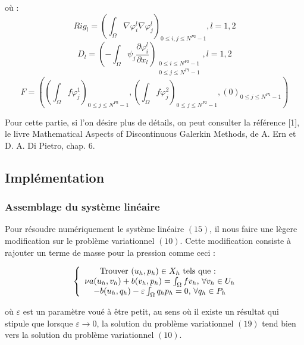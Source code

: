 \documentclass[a4paper,12pt]{article}
\begin{document}
où :
\begin{equation}
Rig_{l} = \left( \int_{\Omega} \nabla \varphi_{i}^{l} \nabla \varphi_{j}^{l} \right)_{0 \leq i,j \leq N^{P2}-1}, l = 1,2
\end{equation}
\begin{equation}
D_{l} = \left( -\int_{\Omega} \psi_{j} \frac{\partial \varphi_{i}^{l}}{\partial x_{l}} \right)_{\substack{
0 \leq i \leq N^{P2}-1 \\
0 \leq j \leq N^{P1}-1
}}, l=1,2
\end{equation}
\begin{equation}
F = \left( \left( \int_{\Omega} f\varphi_{j}^{1} \right)_{0 \leq j \leq N^{P2}-1}, \left( \int_{\Omega} f\varphi_{j}^{2} \right)_{0 \leq j \leq N^{P2}-1}, \left( 0 \right)_{0 \leq j \leq N^{P1}-1} \right)
\end{equation}

Pour cette partie, si l'on désire plus de détails, on peut consulter la référence [1], le livre Mathematical Aspects of Discontinuous Galerkin Methods, de A. Ern et D. A. Di Pietro, chap. 6.


\subsection{Implémentation}

\subsubsection{Assemblage du système linéaire}

Pour résoudre numériquement le système linéaire $(15)$, il nous faire une lègere modification sur le problème variationnel $(10)$. Cette modification consiste à rajouter un terme de masse pour la pression comme ceci :

\begin{equation}
\left \{
\begin{array}{c @{} c}
\text{Trouver } (u_{h},p_{h}) \in X_{h} \text{ tels que : } \\
\nu a(u_{h},v_{h}) + b(v_{h},p_{h}) = \int_{\Omega} fv_{h} \text{, } \forall v_{h} \in U_{h} \\
-b(u_{h},q_{h}) - \varepsilon \int_{\Omega} q_{h} p_{h} = 0 \text{, } \forall q_{h} \in P_{h}\\
\end{array}
\right.
\end{equation}

où $\varepsilon$ est un paramètre voué à être petit, au sens où il existe un résultat qui stipule que lorsque $\varepsilon \longrightarrow 0$, la solution du problème variationnel $(19)$ tend bien vers la solution du problème variationnel $(10)$.
\end{document}

